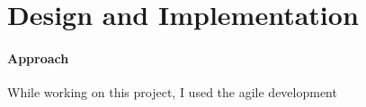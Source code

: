 \chapter{Design and Implementation}
\subsubsection{Approach}

While working on this project, I used the agile development